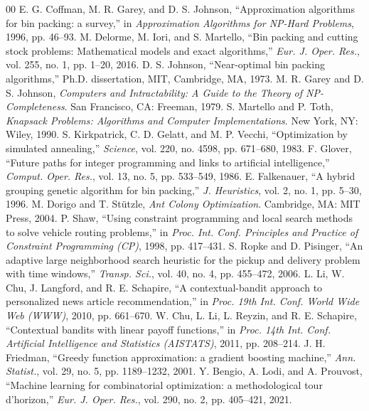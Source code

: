 \documentclass[conference]{IEEEtran}
\begin{document}
\begin{thebibliography}{00}
	 E. G. Coffman, M. R. Garey, and D. S. Johnson, ``Approximation algorithms for bin packing: a survey,'' in \textit{Approximation Algorithms for NP-Hard Problems}, 1996, pp. 46--93.
	 M. Delorme, M. Iori, and S. Martello, ``Bin packing and cutting stock problems: Mathematical models and exact algorithms,'' \textit{Eur. J. Oper. Res.}, vol. 255, no. 1, pp. 1--20, 2016.
	 D. S. Johnson, ``Near-optimal bin packing algorithms,'' Ph.D. dissertation, MIT, Cambridge, MA, 1973.
	 M. R. Garey and D. S. Johnson, \textit{Computers and Intractability: A Guide to the Theory of NP-Completeness}. San Francisco, CA: Freeman, 1979.
	 S. Martello and P. Toth, \textit{Knapsack Problems: Algorithms and Computer Implementations}. New York, NY: Wiley, 1990.
	 S. Kirkpatrick, C. D. Gelatt, and M. P. Vecchi, ``Optimization by simulated annealing,'' \textit{Science}, vol. 220, no. 4598, pp. 671--680, 1983.
	 F. Glover, ``Future paths for integer programming and links to artificial intelligence,'' \textit{Comput. Oper. Res.}, vol. 13, no. 5, pp. 533--549, 1986.
	 E. Falkenauer, ``A hybrid grouping genetic algorithm for bin packing,'' \textit{J. Heuristics}, vol. 2, no. 1, pp. 5--30, 1996.
	 M. Dorigo and T. St\"utzle, \textit{Ant Colony Optimization}. Cambridge, MA: MIT Press, 2004.
	 P. Shaw, ``Using constraint programming and local search methods to solve vehicle routing problems,'' in \textit{Proc. Int. Conf. Principles and Practice of Constraint Programming (CP)}, 1998, pp. 417--431.
	 S. Ropke and D. Pisinger, ``An adaptive large neighborhood search heuristic for the pickup and delivery problem with time windows,'' \textit{Transp. Sci.}, vol. 40, no. 4, pp. 455--472, 2006.
	 L. Li, W. Chu, J. Langford, and R. E. Schapire, ``A contextual-bandit approach to personalized news article recommendation,'' in \textit{Proc. 19th Int. Conf. World Wide Web (WWW)}, 2010, pp. 661--670.
	 W. Chu, L. Li, L. Reyzin, and R. E. Schapire, ``Contextual bandits with linear payoff functions,'' in \textit{Proc. 14th Int. Conf. Artificial Intelligence and Statistics (AISTATS)}, 2011, pp. 208--214.
	 J. H. Friedman, ``Greedy function approximation: a gradient boosting machine,'' \textit{Ann. Statist.}, vol. 29, no. 5, pp. 1189--1232, 2001.
	 Y. Bengio, A. Lodi, and A. Prouvost, ``Machine learning for combinatorial optimization: a methodological tour d'horizon,'' \textit{Eur. J. Oper. Res.}, vol. 290, no. 2, pp. 405--421, 2021.

\end{thebibliography}
\end{document}
